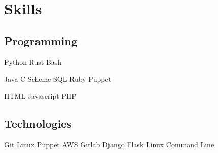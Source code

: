 \documentclass[letterpaper]{deedy-resume} %
\newcommand{\bul}{\textbullet{}}
\begin{document}
\begin{minipage}[t]{0.33\textwidth}
\section{Skills}

\subsection{Programming}


Python \bul Rust \bul Bash


Java \bul C \bul Scheme \bul SQL \bul Ruby \bul Puppet


HTML \bul Javascript \bul PHP

\sectionspace %

\subsection{Technologies}

Git \bul Linux \bul Puppet \bul AWS \bul Gitlab \bul Django \bul Flask
\bul Linux Command Line


\end{minipage} %
\hfill
%
%
\end{document}
